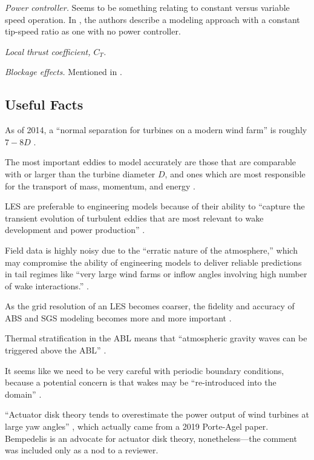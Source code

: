 \documentclass[12pt]{article}
\newcommand{\term}[1]{\emph{#1.}}
\begin{document}
\term{Power controller} 
Seems to be something relating to constant versus variable speed operation. In
\cite{bretonSurveyModellingMethods2017}, the authors describe a modeling
approach with a constant tip-speed ratio as one with no power controller.

\term{Local thrust coefficient, $C_T$}

\term{Blockage effects}
Mentioned in \cite{bempedelisDatadrivenOptimisationWind2024}.

\subsection{Useful Facts}
As of 2014, a ``normal separation for turbines on a modern wind farm'' is
roughly $7-8D$ \cite[pg.4]{mehtaLargeEddySimulation2014}.

The most important eddies to model accurately are those that are comparable
with or larger than the turbine diameter $D$, and ones which are most
responsible for the transport of mass, momentum, and energy
\cite[pg.4]{mehtaLargeEddySimulation2014}.

LES are preferable to engineering models because of their ability to
``capture the transient evolution of turbulent eddies that are most relevant
to wake development and power production'' \cite[pg.9]{mehtaLargeEddySimulation2014}.

Field data is highly noisy due to the ``erratic nature of the atmosphere,''
which may compromise the ability of engineering models to deliver reliable
predictions in tail regimes like ``very large wind farms or inflow angles
involving high number of wake interactions.''
\cite[pg.15]{mehtaLargeEddySimulation2014}.

As the grid resolution of an LES becomes coarser, the fidelity and accuracy of
ABS and SGS modeling becomes more and more important
\cite{mehtaLargeEddySimulation2014}.

Thermal stratification in the ABL means that ``atmospheric gravity waves can be
triggered above the ABL'' \cite{stipaTOSCAOpensourceFinitevolume2024}.

It seems like we need to be very careful with periodic boundary conditions,
because a potential concern is that wakes may be ``re-introduced into the
domain'' \cite[pg.303]{stipaTOSCAOpensourceFinitevolume2024}.

``Actuator disk theory tends to overestimate the power output of wind turbines
at large yaw angles'' \cite[pg.878]{bempedelisDatadrivenOptimisationWind2024},
which actually came from a 2019 Porte-Agel paper. Bempedelis is an advocate for
actuator disk theory, nonetheless—the comment was included only as a nod to a reviewer.
\end{document}
